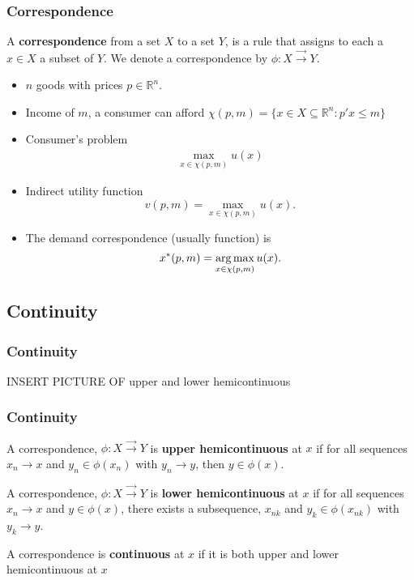 \documentclass[compress]{beamer}
\newcommand{\argmax}{\operatornamewithlimits{arg\,max}}
\def\R{\mathbb{R}}
\renewcommand{\to}{{\rightarrow}}
\newcommand{\corres}{\overrightarrow{\rightarrow}}
\begin{document}
\begin{frame}\frametitle{Correspondence}
  \begin{definition}
    A \textbf{correspondence} from a set $X$ to a set $Y$, is a rule
    that assigns to each a $x \in X$ a subset of $Y$. We denote a
    correspondence by $\phi: X \corres Y$.
  \end{definition}
\end{frame}

\begin{frame}
  \begin{example}
    \begin{itemize}
    \item $n$ goods with prices $p \in \R^n$. 
    \item Income of $m$, a consumer can afford $\chi(p,m)=\{ x \in X \subseteq
      \R^n: p'x \leq m\}$
    \item Consumer's problem
      \begin{align*}
        \max_{x \in \chi(p,m)} u(x) 
      \end{align*}
    \item Indirect utility function
      \[ v(p,m) = \max_{x \in \chi(p,m)} u(x). \]
    \item The demand correspondence (usually function) is
      \[ x^*(p,m) = \argmax_{x \in \chi(p,m)} u(x). \] 
    \end{itemize}
  \end{example}
\end{frame}

\subsection{Continuity}
\begin{frame}\frametitle{Continuity}
  INSERT PICTURE OF upper and lower hemicontinuous  
\end{frame}

\begin{frame}\frametitle{Continuity}
  \begin{definition}
    A correspondence, $\phi: X \corres Y$ is \textbf{upper hemicontinuous} at $x$
    if for all sequences $x_n \to x$ and $y_n \in \phi(x_n)$ with $y_n
    \to y$, then $y \in \phi(x)$. 
  \end{definition}
  \begin{definition}
    A correspondence, $\phi: X \corres Y$ is \textbf{lower hemicontinuous} at $x$
    if for all sequences $x_n \to x$ and $y \in \phi(x)$, there exists a
    subsequence, $x_{nk}$ and $y_k \in \phi(x_{nk})$ with $y_k \to y$.  
  \end{definition}
  \begin{definition}
    A correspondence is \textbf{continuous} at $x$ if it is both upper
    and lower hemicontinuous at $x$
  \end{definition}
\end{frame}
\end{document}

